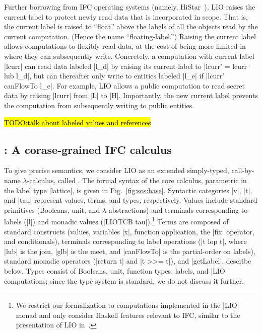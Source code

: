 Further borrowing from IFC operating systems (namely,
HiStar~\cite{zeldovich:histar}), LIO raises the current label to
protect newly read data that is incorporated in scope.
%
That is, the current label is raised to ``float'' above the labels of
all the objects read by the current computation.
(Hence the name ``floating-label.'')
% 
Raising the current label allows computations to flexibly read data,
at the cost of being more limited in where they can subsequently
write.
%
Concretely, a computation with current label |lcurr| can read data
labeled |l_d| by raising its current label to |lcurr' = lcurr lub
l_d|, but can thereafter only write to entities labeled |l_e| if
|lcurr' canFlowTo l_e|.
%
For example, LIO allows a public computation to read secret data by
raising |lcurr| from |L| to |H|. Importantly, the new current label
prevents the computation from subsequently writing to public entities.

\hl{TODO:talk about labeled values and references}
 
\subsection{\lio: A corase-grained IFC calculus}
 
To give precise semantics, we consider LIO as an extended
simply-typed, call-by-name $\lambda$-calculus, called \lio.
%
The formal syntax of the core \lio{} calculus, parametric in the label
type |lattice|, is given in Fig.~\ref{fig:sos:base}.
%
Syntactic categories |v|, |t|, and |tau| represent values, terms, and
types, respectively.
%
Values include standard primitives (Booleans, unit,
and $\lambda$-abstractions) and terminals corresponding to labels
(|l|) and monadic values (|LIOTCB tau|).\footnote{
We restrict our formalization to computations implemented in the |LIO|
monad and only consider Haskell features relevant to IFC, similar to
the presentation of LIO in~\cite{stefan:lio,stefan:addressing-covert}.
}
%
Terms are composed of standard constructs (values, variables |x|,
function application, the |fix| operator, and conditionals), terminals
corresponding to label operations (|t lop t|, where |lub| is the join,
|glb| is the meet, and |canFlowTo| is the partial-order on labels),
standard monadic operators (|return t| and |t >>= t|), and |getLabel|,
describe below.
%
Types consist of Booleans, unit, function types, labels, and |LIO|
computations; since the \lio{} type system is standard, we do not
discuss it further.

